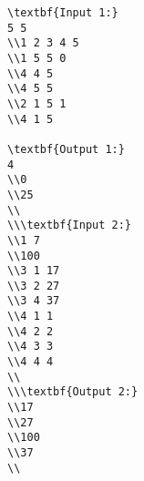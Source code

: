 \begin{verbatim}
\textbf{Input 1:}
5 5 
\\1 2 3 4 5 
\\1 5 5 0 
\\4 4 5 
\\4 5 5 
\\2 1 5 1 
\\4 1 5

\textbf{Output 1:}
4
\\0
\\25 
\\
\\\textbf{Input 2:}
\\1 7 
\\100 
\\3 1 17 
\\3 2 27 
\\3 4 37 
\\4 1 1 
\\4 2 2 
\\4 3 3 
\\4 4 4
\\
\\\textbf{Output 2:}
\\17 
\\27 
\\100
\\37
\\\end{verbatim}